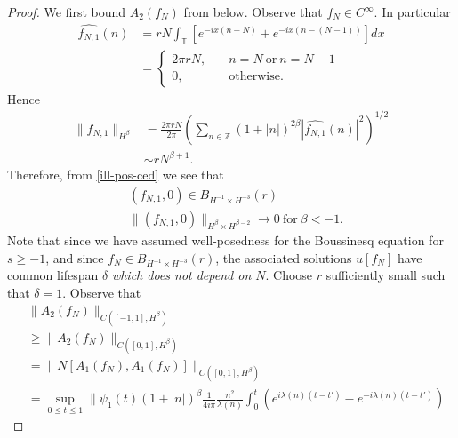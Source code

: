 \documentclass[12pt,reqno]{amsart}
\numberwithin{equation}{section}  %
\newcommand{\zz}{\mathbb{Z}}
\newcommand{\ci}{\mathbb{T}}
\newcommand{\wh}{\widehat}
\begin{document}
\begin{proof}
  We first bound $A_{2}(f_{N})$ from below.
  Observe that $f_{N} \in C^{\infty}$. In particular
%
%
\begin{equation}
  \label{ill-pos-ce}
\begin{split}
  \wh{f_{N,1}}(n)
  & = r N\int_{\ci} [e^{-ix(n - N)} + e^{-ix(n - (N-1))}]  dx  
  \\ 
  & = 
  \begin{cases}
    2 \pi r N,  \quad  & n = N \ \text{or} \ n = N-1
    \\
     0, \quad  & \text{otherwise}.
  \end{cases}
\end{split}
\end{equation}
%
Hence
%
%
\begin{equation}
  \label{ill-pos-ced}
\begin{split}
  \| f_{N,1} \|_{H^{\beta}}
  & = \frac{2 \pi r N}{2 \pi} \left( \sum_{n \in \zz} (1 + | n |)^{2 \beta} |
  \wh{f_{N,1}}(n) |^{2} \right)^{1/2}
  \\
  & \sim rN^{\beta +1}.
\end{split}
\end{equation}
%
%
Therefore, from \eqref{ill-pos-ced} we see that 
\begin{equation*}
  \begin{split}
    & (f_{N,1}, 0) \in B_{H^{-1} \times H^{-3}}(r)
    \\
    & \|(f_{N,1}, 0)\|_{H^{\beta} \times H^{\beta -2}} \to 0 \ \text{for} \ \beta < -1.
    \end{split}
\end{equation*}
Note that since we have assumed well-posedness for the Boussinesq equation for $s
\ge -1$, and since $f_{N} \in B_{H^{-1} \times H^{-3}}(r)$, the associated
solutions $u[f_{N}]$ have common lifespan $\delta$ \emph{which does not depend
on $N$}. Choose $r$ sufficiently small such that $\delta =1$.  
Observe that
%
%
\begin{equation*}
\begin{split}
  & \| A_{2}(f_{N}) \|_{C([-1, 1], H^{\beta})} 
  \\
& \ge \| A_{2}(f_{N}) \|_{C([0, 1], H^{\beta})} 
\\
  &  =  \| N[A_{1}(f_{N}), A_{1}(f_{N})] \|_{C([0, 1],
  H^{\beta})} 
  \\
  & = \sup_{0 \le t \le 1} \| \psi_{1}(t) (1 + | n |)^{\beta}
  \frac{1}{4 i \pi} \frac{n^{2}}{\lambda(n)}
  \int_{0}^{t} \left( e^{i\lambda(n)(t-t')} - e^{-i\lambda(n)(t-t')} \right)

\end{split}
\end{equation*}
\end{proof}
\end{document}
